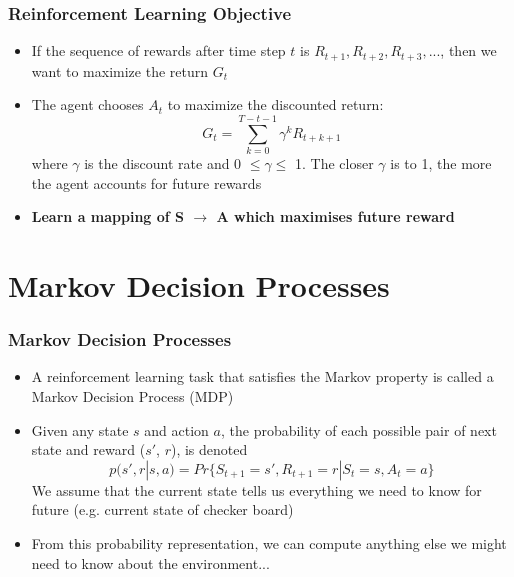 \documentclass{beamer}
\begin{document}

\begin{frame}
\frametitle{Reinforcement Learning Objective}
\begin{itemize}
\item If the sequence of rewards after time step $t$ is $R_{t+1}, R_{t+2}, R_{t+3},...$, then we want to maximize the return $G_t$
\item The agent chooses $A_t$ to maximize the discounted return: 
\begin{equation}
G_t = \sum_{k=0}^{T-t-1} \gamma^k R_{t+k+1}
\nonumber
\end{equation}
where $\gamma$ is the discount rate and 0 $\leq \gamma \leq$ 1. The closer $\gamma$ is to 1, the more the agent accounts for future rewards
\item \textbf{Learn a mapping of S $\rightarrow$ A which maximises future reward}
\end{itemize}
\end{frame}

\section{Markov Decision Processes} %






\begin{frame}
\frametitle{Markov Decision Processes}
\begin{itemize}
\item A reinforcement learning task that satisfies the Markov property is called a Markov Decision Process (MDP)
\item Given any state $s$ and action $a$, the probability of each possible pair of next state and reward ($s'$, $r$), is denoted
\begin{equation}
p(s',r | s,a) = Pr\{S_{t+1} = s', R_{t+1} = r | S_t = s, A_t = a\}
\nonumber
\end{equation}
We assume that the current state tells us everything we need to know for future (e.g. current state of checker board)
\item From this probability representation, we can compute anything else we might need to know about the environment...
\end{itemize}
\end{frame}
\end{document}
